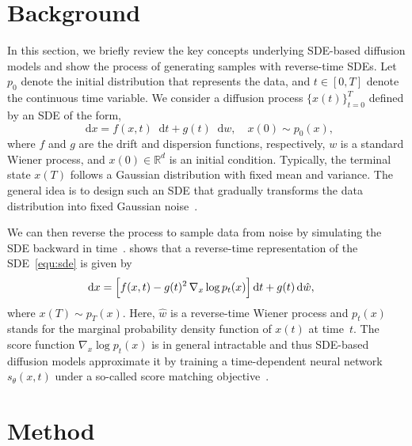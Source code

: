 \documentclass{article}
\newcommand{\R}{\mathbb{R}}
\newcommand{\diff}{\mathop{}\!\mathrm{d}}
\theoremstyle{plain}
\theoremstyle{definition}
\theoremstyle{remark}
\begin{document}
%
 \section{Background}
\label{section:background}

In this section, we briefly review the key concepts underlying SDE-based diffusion models and show the process of generating samples with reverse-time SDEs.
Let $p_0$ denote the initial distribution that represents the data, and $t \in [0, T]$ denote the continuous time variable. We consider a diffusion process $\{{x}(t)\}_{t=0}^T$ defined by an SDE of the form,
\begin{equation}
	\diff {x} = f({x}, t) \diff t + g(t)\diff w, \quad {x}(0) \sim p_0({x}), 
	\label{equ:sde}
\end{equation}
where $f$ and $g$ are the drift and dispersion functions, respectively, $w$ is a standard Wiener process, and ${x}(0) \in \R^{d}$ is an initial condition. Typically, the terminal state ${x}(T)$ follows a Gaussian distribution with fixed mean and variance. The general idea is to design such an SDE that gradually transforms the data distribution into fixed Gaussian noise~\citep{song2021score,lu2022dpm,de2022riemannian}.


We can then reverse the process to sample data from noise by simulating the SDE backward in time~\citep{song2021score}. \citet{anderson1982reverse} shows that a reverse-time representation of the SDE~\eqref{equ:sde} is given by
\begin{equation}
    \begin{split}
        \diff {x} &= \Bigl[ f({x}, t) - g(t)^2\, \nabla_{{x}} \log p_t({x}) \Bigr] \diff t + g(t) \diff \hat{w},
\end{split}
    \label{equ:reverse-sde}
\end{equation}
where ${x}(T) \sim p_T({x})$. Here, $\hat{w}$ is a reverse-time Wiener process and $p_t({x})$ stands for the marginal probability density function of ${x}(t)$ at time~$t$. The score function $\nabla_{x} \log p_t({x})$ is in general intractable and thus SDE-based diffusion models approximate it by training a time-dependent neural network $s_\theta({x}, t)$ under a so-called score matching objective~\citep{hyvarinen2005estimation,song2021score}.

 \section{Method}
\label{section:method}
\end{document}
